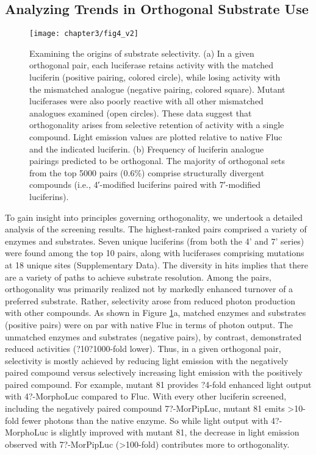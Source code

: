 \subsection*{Analyzing Trends in Orthogonal Substrate Use}
\begin{figure}[htbp]
\texttt{[image: chapter3/fig4\_v2]}
\centering
\caption[Examining the origins of substrate selectivity]{Examining the origins of substrate selectivity. (a) In a given orthogonal pair, each luciferase retains activity with the matched luciferin (positive pairing, colored circle), while losing activity with the mismatched analogue (negative pairing, colored square). Mutant luciferases were also poorly reactive with all other mismatched analogues examined (open circles). These data suggest that orthogonality arises from selective retention of activity with a single compound. Light emission values are plotted relative to native Fluc and the indicated luciferin. (b) Frequency of luciferin analogue pairings predicted to be orthogonal. The majority of orthogonal sets from the top 5000 pairs (0.6\%{}) comprise structurally divergent compounds (i.e., 4′-modified luciferins paired with 7′-modified luciferins).}
  \label{fig:heatmap}
\end{figure}
To gain insight into principles governing orthogonality, we undertook a detailed analysis of the screening results. The highest-ranked pairs comprised a variety of enzymes and substrates. Seven unique luciferins (from both the 4' and 7' series) were found among the top 10 pairs, along with luciferases comprising mutations at 18 unique sites (Supplementary Data).
The diversity in hits implies that there are a variety of paths to achieve substrate resolution. Among the pairs, orthogonality was primarily realized not by markedly enhanced turnover of a preferred substrate. Rather, selectivity arose from reduced photon production with other compounds. As shown in Figure \ref{fig:heatmap}a, matched enzymes and substrates (positive pairs) were on par with native Fluc in terms of photon output. The unmatched enzymes and substrates (negative pairs), by contrast, demonstrated reduced activities (?10?1000-fold lower). Thus, in a given orthogonal pair, selectivity is mostly achieved by reducing light emission with the negatively paired compound versus selectively increasing light emission with the positively paired compound. For example, mutant 81 provides ?4-fold enhanced light output with 4?-MorphoLuc compared to Fluc. With every other luciferin screened, including the negatively paired compound 7?-MorPipLuc, mutant 81 emits >10-fold fewer photons than the native enzyme. So while light output with 4?-MorphoLuc is slightly improved with mutant 81, the decrease in light emission observed with 7?-MorPipLuc (>100-fold) contributes more to orthogonality.
